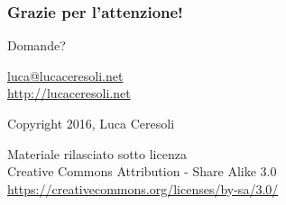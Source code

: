 \documentclass[xetex,table]{beamer}
\begin{document}
\begin{frame}
  \frametitle{Grazie per l'attenzione!}

  \begin{center}
    {\Huge Domande?}

    \vspace{0.1\textheight}

    \href{mailto:luca@lucaceresoli.net}{luca@lucaceresoli.net}\\
    \url{http://lucaceresoli.net}

    \textcopyright{} Copyright 2016, Luca Ceresoli\\

    \vspace{0.2\textheight}

    \tiny
    Materiale rilasciato sotto licenza\\
    Creative Commons Attribution - Share Alike 3.0 \\
    \url{https://creativecommons.org/licenses/by-sa/3.0/} \\
\end{center}
\end{frame}
\end{document}
